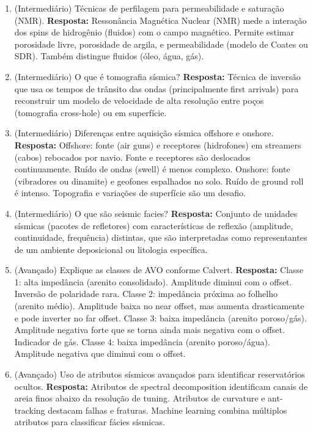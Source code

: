 \documentclass[11pt,a4paper]{article}
\begin{document}
\begin{enumerate}
  \item (Intermediário) Técnicas de perfilagem para permeabilidade e saturação (NMR).
  \textbf{Resposta:} Ressonância Magnética Nuclear (NMR) mede a interação dos spins de hidrogênio (fluidos) com o campo magnético. Permite estimar porosidade livre, porosidade de argila, e permeabilidade (modelo de Coates ou SDR). Também distingue fluidos (óleo, água, gás).

  \item (Intermediário) O que é tomografia sísmica?
  \textbf{Resposta:} Técnica de inversão que usa os tempos de trânsito das ondas (principalmente first arrivals) para reconstruir um modelo de velocidade de alta resolução entre poços (tomografia cross-hole) ou em superfície.

  \item (Intermediário) Diferenças entre aquisição sísmica offshore e onshore.
  \textbf{Resposta:} Offshore: fonte (air guns) e receptores (hidrofones) em streamers (cabos) rebocados por navio. Fonte e receptores são deslocados continuamente. Ruído de ondas (swell) é menos complexo. Onshore: fonte (vibradores ou dinamite) e geofones espalhados no solo. Ruído de ground roll é intenso. Topografia e variações de superfície são um desafio.

  \item (Intermediário) O que são seismic facies?
  \textbf{Resposta:} Conjunto de unidades sísmicas (pacotes de refletores) com características de reflexão (amplitude, continuidade, frequência) distintas, que são interpretadas como representantes de um ambiente deposicional ou litologia específica.

  \item (Avançado) Explique as classes de AVO conforme Calvert.
  \textbf{Resposta:} Classe 1: alta impedância (arenito consolidado). Amplitude diminui com o offset. Inversão de polaridade rara. Classe 2: impedância próxima ao folhelho (arenito médio). Amplitude baixa no near offset, mas aumenta drasticamente e pode inverter no far offset. Classe 3: baixa impedância (arenito poroso/gás). Amplitude negativa forte que se torna ainda mais negativa com o offset. Indicador de gás. Classe 4: baixa impedância (arenito poroso/água). Amplitude negativa que diminui com o offset.

  \item (Avançado) Uso de atributos sísmicos avançados para identificar reservatórios ocultos.
  \textbf{Resposta:} Atributos de spectral decomposition identificam canais de areia finos abaixo da resolução de tuning. Atributos de curvature e ant-tracking destacam falhas e fraturas. Machine learning combina múltiplos atributos para classificar fácies sísmicas.


\end{enumerate}
\end{document}
